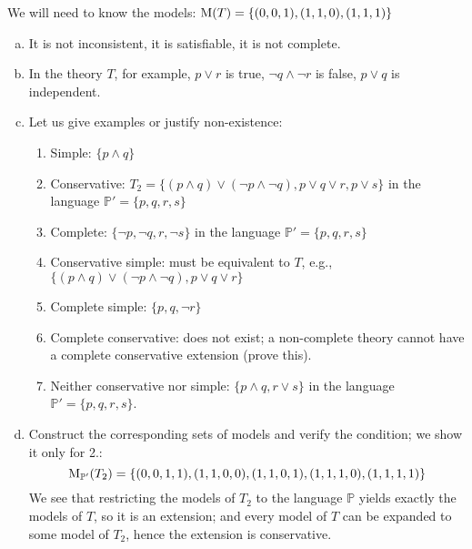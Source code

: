 \begin{problem}
    \begin{solution}
        We will need to know the models: $\operatorname{M}(T)=\{(0,0,1),(1,1,0),(1,1,1)\}$
        \begin{enumerate}[(a)]
            \item It is not inconsistent, it is satisfiable, it is not complete.
            \item In the theory $T$, for example, $p\lor r$ is true, $\neg q\land\neg r$ is false, $p\lor q$ is independent.  
            \item Let us give examples or justify non-existence:
            \begin{enumerate}[1.]
                \item Simple: $\{p\land q\}$
                \item Conservative: $T_2=\{(p\land q)\lor(\neg p\land\neg q), p\lor q\lor r,p\lor s\}$ in the language $\mathbb P'=\{p,q,r,s\}$
                \item Complete: $\{\neg p,\neg q,r,\neg s\}$ in the language $\mathbb P'=\{p,q,r,s\}$
                \item Conservative simple: must be equivalent to $T$, e.g., $\{(p\land q)\lor(\neg p\land\neg q), p\lor q\lor r\}$
                \item Complete simple: $\{p,q,\neg r\}$
                \item Complete conservative: does not exist; a non-complete theory cannot have a complete conservative extension (prove this).
                \item Neither conservative nor simple: $\{p\land q,r\lor s\}$ in the language $\mathbb P'=\{p,q,r,s\}$.
            \end{enumerate}
            \item Construct the corresponding sets of models and verify the condition; we show it only for 2.:
            $$
            \operatorname{M}_{\mathbb P'}(T_2)=\{(0,0,1,1),(1,1,0,0),(1,1,0,1),(1,1,1,0),(1,1,1,1)\}
            $$
            We see that restricting the models of $T_2$ to the language $\mathbb P$ yields exactly the models of $T$, so it is an extension; and every model of $T$ can be expanded to some model of $T_2$, hence the extension is conservative.
        \end{enumerate}
            
    \end{solution}
    
\end{problem}


